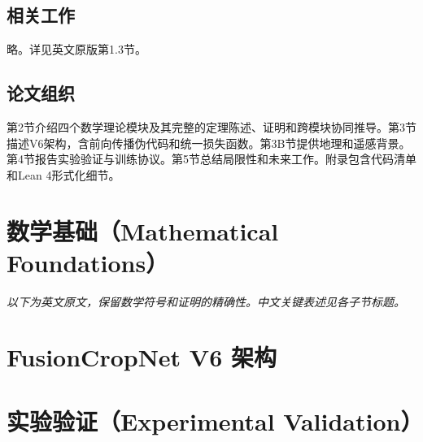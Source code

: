 \documentclass[12pt,a4paper]{ctexart}
\begin{document}
\subsection{相关工作}

略。详见英文原版第1.3节。

\subsection{论文组织}

第2节介绍四个数学理论模块及其完整的定理陈述、证明和跨模块协同推导。第3节描述V6架构，含前向传播伪代码和统一损失函数。第3B节提供地理和遥感背景。第4节报告实验验证与训练协议。第5节总结局限性和未来工作。附录包含代码清单和Lean 4形式化细节。

\newpage

\section{数学基础（Mathematical Foundations）}

\textit{以下为英文原文，保留数学符号和证明的精确性。中文关键表述见各子节标题。}




\newpage

\section{FusionCropNet V6 架构}





\newpage

\section{实验验证（Experimental Validation）}
\end{document}
